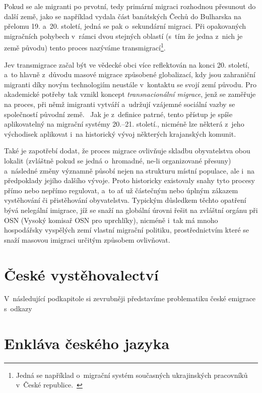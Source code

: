 Pokud se ale migranti po prvotní, tedy primární migraci rozhodnou přesunout do další země, jako se například vydala část banátských Čechů do Bulharska na přelomu 19. a~20. století, jedná se pak o~sekundární migraci. Při opakovaných migračních pohybech v~rámci dvou stejných oblastí (s~tím že jedna z~nich je země původu) tento proces nazýváme transmigrací\footnote{Jedná se například o~migrační systém současných ukrajinských pracovníků v~České republice.~\parencite{Nespor2005} }.~\parencite{Nespor2005}

Jev transmigrace začal být ve vědecké obci více reflektován na konci 20. století, a~to hlavně z~důvodu masové migrace způsobené globalizací, kdy jsou zahraniční migranti díky novým technologiím neustále v~kontaktu se svojí zemí původu. Pro akademické potřeby tak vznikl koncept \emph{transnacionální migrace}, jenž se zaměřuje na proces, při němž imigranti vytváří a~udržují vzájemné sociální vazby se společností původní země.~\parencite{Kralova2013} Jak je z~definice patrné, tento přístup je spíše aplikovatelný na migrační systémy 20.--21. století., nicméně lze některá z~jeho východisek aplikovat i~na historický vývoj některých krajanských komunit.

Také je zapotřebí dodat, že proces migrace ovlivňuje skladbu obyvatelstva obou lokalit (zvláštně pokud se jedná o~hromadné, ne-li organizované přesuny) a~následné změny významně působí nejen na strukturu místní populace, ale i~na předpoklady jejího dalšího vývoje. Proto historicky existovaly snahy tyto procesy přímo nebo nepřímo regulovat, a~to ať už částečným nebo úplným zákazem vystěhování či přistěhování obyvatelstva. Typickým důsledkem těchto opatření bývá nelegální imigrace, jíž se snaží na globální úrovni řešit na zvláštní orgánu při OSN (Vysoký komisař OSN pro uprchlíky), nicméně i~tak má mnoho hospodářsky vyspělých zemí vlastní migrační politiku, prostřednictvím které se snaží masovou imigraci určitým způsobem ovlivňovat.~\parencite{Fialova2017a}

\hypertarget{ux10deskuxe9-vystux11bhovalectvuxed-1}{%
\section{České vystěhovalectví}\label{ux10deskuxe9-vystux11bhovalectvuxed-1}}

V~následující podkapitole si zevrubněji představíme problematiku české emigrace s~odkazy

\hypertarget{enkluxe1va-ux10deskuxe9ho-jazyka}{%
\section{Enkláva českého jazyka}\label{enkluxe1va-ux10deskuxe9ho-jazyka}}
